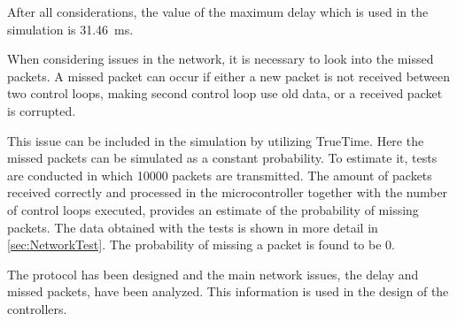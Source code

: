 After all considerations, the value of the maximum delay which is used in the simulation is \SI{31.46}{ms}.

When considering issues in the network, it is necessary to look into the missed packets. A missed packet can occur if either a new packet is not received between two control loops, making second control loop use old data, or a received packet is corrupted.

This issue can be included in the simulation by utilizing TrueTime. Here the missed packets can be simulated as a constant probability. To estimate it, tests are conducted in which 10000 packets are transmitted. The amount of packets received correctly and processed in the microcontroller together with the number of control loops executed, provides an estimate of the probability of missing packets. The data obtained with the tests is shown in more detail in \autoref{sec:NetworkTest}. The probability of missing a packet is found to be 0.

The protocol has been designed and the main network issues, the delay and missed packets, have been analyzed. This information is used in the design of the controllers.